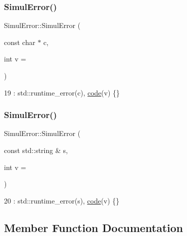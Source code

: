 \subsubsection{\texorpdfstring{Simul\+Error()}{SimulError()}\hspace{0.1cm}{\footnotesize\ttfamily [1/2]}}
{\footnotesize\ttfamily Simul\+Error\+::\+Simul\+Error (\begin{DoxyParamCaption}\item[{const char $\ast$}]{c,  }\item[{int}]{v = {} }\end{DoxyParamCaption})\hspace{0.3cm}{\ttfamily [inline]}}


\begin{DoxyCode}
19 : std::runtime\_error(c), \hyperlink{classSimulError_a5cd98a7eddc7982f5c715ef1c76a1bc2}{code}(v) \{\}
\end{DoxyCode}
\mbox{\label{classSimulError_a475bd5eab2cafd9c6b72471449dc2576}} 
\subsubsection{\texorpdfstring{Simul\+Error()}{SimulError()}\hspace{0.1cm}{\footnotesize\ttfamily [2/2]}}
{\footnotesize\ttfamily Simul\+Error\+::\+Simul\+Error (\begin{DoxyParamCaption}\item[{const std\+::string \&}]{s,  }\item[{int}]{v = {} }\end{DoxyParamCaption})\hspace{0.3cm}{\ttfamily [inline]}}


\begin{DoxyCode}
20 : std::runtime\_error(s), \hyperlink{classSimulError_a5cd98a7eddc7982f5c715ef1c76a1bc2}{code}(v) \{\}
\end{DoxyCode}


\subsection{Member Function Documentation}
\mbox{\label{classSimulError_a34627c973b586c593d8ed0f7352bc401}} 
